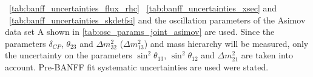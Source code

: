 \begin{table}[htb]
{~\ref{tab:banff_uncertainties_flux_rhc}
~\ref{tab:banff_uncertainties_xsec}
and
~\ref{tab:banff_uncertainties_skdetfsi}
and the oscillation parameters of the Asimov data set A shown in \cref{tab:osc_params_joint_asimov}
are used.
Since the parameters $\delta_{CP}$, $\theta_{23}$ and $\Delta m^2_{32}$ ($\Delta m^2_{13}$) and mass hierarchy
will be measured,
only the uncertainty on the parameters 
$\sin^2 \theta_{13}$,
$\sin^2 \theta_{12}$
and 
$\Delta m^2_{21}$ 
are taken into account.
Pre-BANFF fit systematic uncertainties are used were stated.
}                                                                                                                                                                                          
\label{tab:nsk_systematic_table_summary_joint_asimov_A_rhc_elike}
\end{table}


















